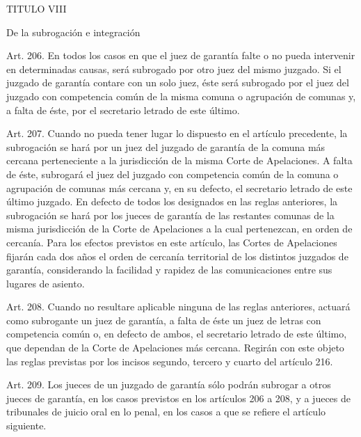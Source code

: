     TITULO VIII

    De la subrogación e integración


    Art. 206. En todos los casos en que el juez de garantía falte o no pueda intervenir en determinadas causas, será subrogado por otro juez del mismo juzgado.
    Si el juzgado de garantía contare con un solo juez, éste será subrogado por el juez del juzgado con competencia común de la misma comuna o agrupación de comunas y, a falta de éste, por el secretario letrado de este último.

    Art. 207. Cuando no pueda tener lugar lo dispuesto en el artículo precedente, la subrogación se hará por un juez del juzgado de garantía de la comuna más cercana perteneciente a la jurisdicción de la misma Corte de Apelaciones.
    A falta de éste, subrogará el juez del juzgado con competencia común de la comuna o agrupación de comunas más cercana y, en su defecto, el secretario letrado de este último juzgado.
    En defecto de todos los designados en las reglas anteriores, la subrogación se hará por los jueces de garantía de las restantes comunas de la misma jurisdicción de la Corte de Apelaciones a la cual pertenezcan, en orden de cercanía.
    Para los efectos previstos en este artículo, las Cortes de Apelaciones fijarán cada dos años el orden de cercanía territorial de los distintos juzgados de garantía, considerando la facilidad y rapidez de las comunicaciones entre sus lugares de asiento.

    Art. 208. Cuando no resultare aplicable ninguna de las reglas anteriores, actuará como subrogante un juez de garantía, a falta de éste un juez de letras con competencia común o, en defecto de ambos, el secretario letrado de este último, que dependan de la Corte de Apelaciones más cercana. Regirán con este objeto las reglas previstas por los incisos segundo, tercero y cuarto del artículo 216.

    Art. 209. Los jueces de un juzgado de garantía sólo podrán subrogar a otros jueces de garantía, en los casos previstos en los artículos 206 a 208, y a jueces de tribunales de juicio oral en lo penal, en los casos a que se refiere el artículo siguiente.

